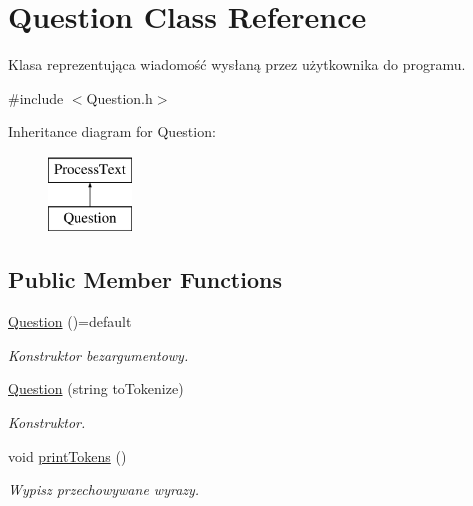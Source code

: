 \hypertarget{class_question}{}\section{Question Class Reference}
\label{class_question}


Klasa reprezentująca wiadomość wysłaną przez użytkownika do programu.  




{\ttfamily \#include $<$Question.\+h$>$}

Inheritance diagram for Question\+:\begin{figure}[H]
\begin{center}
\leavevmode
\includegraphics[height=2.000000cm]{class_question}
\end{center}
\end{figure}
\subsection*{Public Member Functions}
\begin{DoxyCompactItemize}
\item 
\mbox{\label{class_question_ab123bd04a1bc523172d415ece2ffcbed}} 
\mbox{\hyperlink{class_question_ab123bd04a1bc523172d415ece2ffcbed}{Question}} ()=default
\begin{DoxyCompactList}\small\item\em Konstruktor bezargumentowy. \end{DoxyCompactList}\item 
\mbox{\hyperlink{class_question_a78715ae00f2c53067f45c51fbd6febf5}{Question}} (string to\+Tokenize)
\begin{DoxyCompactList}\small\item\em Konstruktor. \end{DoxyCompactList}\item 
\mbox{\label{class_question_a275dbddd7f327619efdad215da4ee4f0}} 
void \mbox{\hyperlink{class_question_a275dbddd7f327619efdad215da4ee4f0}{print\+Tokens}} ()
\begin{DoxyCompactList}\small\item\em Wypisz przechowywane wyrazy. \end{DoxyCompactList}\end{DoxyCompactItemize}
